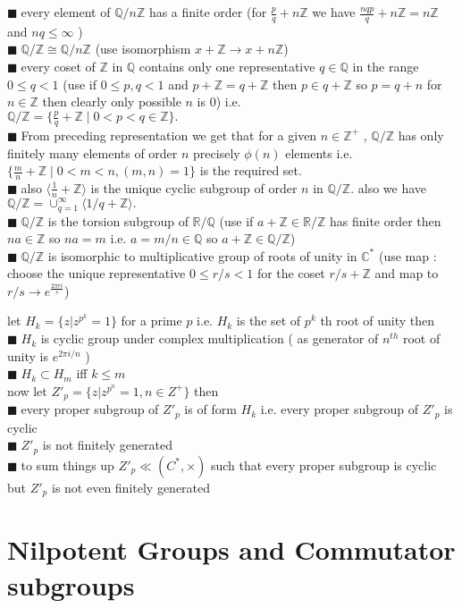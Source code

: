 \documentclass[11pt]{extarticle}
\newcommand{\R}{\mathbb{R}}
\newcommand{\C}{\mathbb{C}}
\newcommand{\Z}{\mathbb{Z}}
\newcommand{\Q}{\mathbb{Q}}
\newcommand{\ra}{\rightarrow}
\newcommand{\snote}[1]{{\footnotesize(#1)}}
\newcommand{\y}{$\blacksquare\;$}
\newcommand{\gen}[1]{\langle #1 \rangle}
\newcommand{\tbx}[2][]{
	\begin{tcolorbox}[enhanced,breakable,size=small,colback=black!2!white,title={#1},arc is angular, arc=1.5mm,drop fuzzy shadow]
		#2
	\end{tcolorbox}
}
\newcommand{\tm}{\times}
\begin{document}
\begin{multicols}{2}
\tbx[$ \Q/\Z $ ]{
\y every element of $ \Q/n\Z $ has a finite order \snote{for $ \frac{ p }{q} +n\Z  $ we have $ \frac{ nqp }{q} +n\Z =n\Z$ and $ nq\leq \infty $ }\\
\y $ \Q/\Z \cong \Q/n\Z $ \snote{use isomorphism $ x+\Z\ra x+n\Z $}\\
\y every coset of $ \Z $ in $ \Q $ contains only one representative $ q\in \Q $ in the range $ 0\leq q<1 $ \snote{use if $ 0\leq p,q<1 $ and $ p+\Z=q+\Z $ then $ p\in q+\Z $ so $ p=q+n $ for $ n\in \Z $ then clearly only possible $ n $ is $ 0 $} i.e.\\
$ \Q/\Z=\{\frac{ p }{q} +\Z \; |\; 0<p<q\in \Z\}. $ \\
\y From preceding representation we get that for a given $ n\in \Z^+ $ , $\Q/\Z $ has only finitely many elements of order $ n $ precisely $ \phi(n) $ elements i.e.  $ \{\frac{ m }{n} +\Z\;|\; 0<m<n,(m,n)=1\} $ is the required set.\\
\y also $ \gen{\frac{ 1 }{ n} +\Z} $ is the unique cyclic subgroup of order $ n $ in $ \Q/\Z .$ also we have 
$ \Q/\Z=\cup_{q=1}^{\infty}\gen{1 /q+\Z} .$\\
\y $ \Q/\Z $ is the torsion subgroup of $ \R/\Q $ \snote{use if $ a+\Z\in \R/\Z $ has finite order then $ na\in \Z $ so $ na=m $ i.e. $ a= m /n\in \Q $ so $ a+\Z\in \Q/\Z $}\\
\y $ \Q/\Z $ is isomorphic to multiplicative group of roots of unity in $ \C^* $ \snote{use map : choose the unique representative $0\leq r/s<1 $ for the coset $ r/s+\Z $ and map to $ r/s \ra e^{\frac{2\pi r i}{s}} $}}
\tbx[a useful example Prüfer p-group $ Z'_p $ ]
{let $ H_k=\{z|z^{p^k}=1\} $ for a prime $ p $ i.e. $ H_k $ is the set of $ p^k $ th root of unity then\\
\y $ H_k $ is cyclic group under complex multiplication \snote{ as generator of $ n^{th} $ root of unity is $ e^{2\pi i/n} $ }\\
\y $ H_k\subset H_m $ iff $ k\leq m $ \\ 
now let $ Z'_p=\{z|z^{p^n}=1, n\in Z^+\} $ then \\
\y every proper subgroup of $ Z'_p $ is of form $ H_k $ i.e. every proper subgroup of $ Z'_p $ is cyclic \\
\y $ Z'_p $ is not finitely generated \\
\y to sum things up $ Z'_p\ll(C^*,\tm) $ such that every proper subgroup is cyclic but $ Z'_p $ is not even finitely generated}


	
	\section{Nilpotent Groups and Commutator subgroups}
	

\end{multicols}
\end{document}
